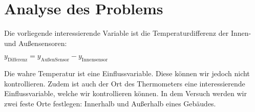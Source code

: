 \documentclass[ ngerman, fontsize= 12pt, paper=a4, headings=big, titlepage=true]{article}
\begin{document}
\section{Analyse des Problems}
%		
%	
%	
%	
%	

Die vorliegende interessierende Variable ist die Temperaturdifferenz der Innen-und Außensensoren:\\
\begin{center}
	$y_{\text{Differenz}} = y_{\text{AußenSensor}}-y_{\text{Innensensor}} $
\end{center}

Die wahre Temperatur ist eine Einflussvariable. Diese können wir jedoch nicht kontrollieren.  Zudem ist auch der Ort des Thermometers eine interessierende Einflussvariable, welche wir kontrollieren können. In dem Versuch werden wir zwei feste Orte festlegen: Innerhalb und Außerhalb eines Gebäudes. \\
\end{document}
